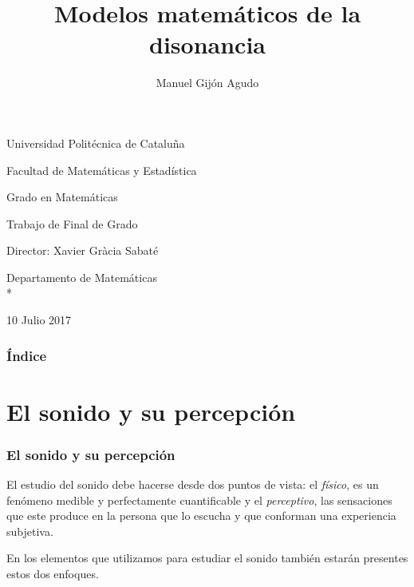 \documentclass[12 pt]{beamer}
\title{Modelos matemáticos de la disonancia}
\author{\normalsize{Manuel Gijón Agudo}}
\date{}
\begin{document}


\begin{frame}[plain]
    \begin{center}

        Universidad Politécnica de Cataluña
        
        Facultad de Matemáticas y Estadística
        
        Grado en Matemáticas
        
        \scriptsize{Trabajo de Final de Grado}
        
        \maketitle    
        Director: Xavier Gràcia Sabaté
    
        Departamento de Matemáticas\\*
        
        \small{10 Julio 2017}
    \end{center}
    
    
\end{frame}



\begin{frame}{1}

    \frametitle{Índice}
     
    \tableofcontents  %
\end{frame}

\section{El sonido y su percepción}

\begin{frame}{3}
    \frametitle{El sonido y su percepción}
  
    El estudio del sonido debe hacerse desde dos puntos de vista: el \emph{físico}, es un fenómeno medible y perfectamente cuantificable y el \emph{perceptivo}, las sensaciones que este produce en la persona que lo escucha y que conforman una experiencia subjetiva.
    
    \vspace{1cm}
    En los elementos que utilizamos para estudiar el sonido también estarán presentes estos dos enfoques.   
    
\end{frame}
\end{document}

